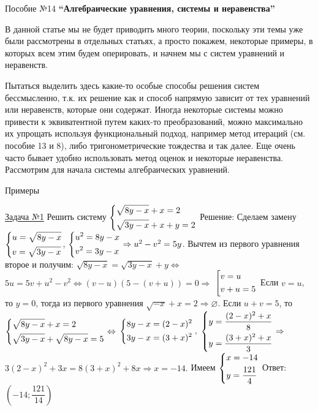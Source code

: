 \documentclass[a4paper,12pt]{article} %
\date{}
\author{}
\begin{document}
\begin{flushleft}
{Пособие №14}
\hfill
{\bf ``Алгебраические уравнения, системы и неравенства''}
\end{flushleft}				

В данной статье мы не будет приводить много теории, поскольку эти темы уже
были рассмотрены в отдельных статьях, а просто покажем, некоторые примеры, 
в которых всем этим будем оперировать, и начнем мы с систем уравнений и неравенств.

Пытаться выделить здесь какие-то особые способы решения систем бессмысленно, 
т.к. их решение как и способ напрямую зависит от тех уравнений или неравенств, которые они содержат.
Иногда некоторые системы можно привести к эквиватентной путем каких-то преобразований, можно
максимально их упрощать используя функциональный подход, например метод итераций (см. пособие 13 и 8), либо
тригонометрические тождества и так далее. Еще очень часто бывает удобно использовать метод
оценок и некоторые неравенства. Рассмотрим для начала системы алгебраических уравнений.

\begin{center}
{\large Примеры}
\end{center}

\label{Problem1}
\underline{Задача №1}
Решить систему $\begin{dcases}
	\sqrt{8y-x}+x=2 \\
	\sqrt{3y-x}+x+y=2
\end{dcases}$\newline
Решение: Сделаем замену 
$\begin{dcases}
	u = \sqrt{8y-x} \\
	v = \sqrt{3y-x}
\end{dcases}$,
$\begin{dcases}
	u^2 = 8y-x \\
	v^2 = 3y-x
\end{dcases}\Rightarrow u^2-v^2=5y$.
Вычтем из первого уравнения второе и получим: $\sqrt{8y-x}=\sqrt{3y-x}+y \Leftrightarrow$
$5u=5v+u^2-v^2 \Leftrightarrow (v-u)(5-(v+u))=0 \Rightarrow $
$\left[ \begin{gathered}
	v=u \hfill \\
	v+u = 5
\end{gathered} \right.$
Если $v=u$, то $y=0$, тогда из первого уравнения $\sqrt{-x}+x=2 \Rightarrow \varnothing$.
Если $u+v=5$, то  
$\begin{dcases}
	\sqrt{8y-x}+x=2 \\
	\sqrt{3y-x}+\sqrt{8y-x}=5
\end{dcases} \Leftrightarrow$
$\begin{dcases}
	8y-x=(2-x)^2 \\
	3y-x=(3+x)^2
\end{dcases}, $
$\begin{dcases}
	y=\dfrac{(2-x)^2+x}{8} \\
	y=\dfrac{(3+x)^2+x}{3}
\end{dcases} \Rightarrow$
$3(2-x)^2+3x=8(3+x)^2+8x \Rightarrow x=-14.$
Имеем 
$\begin{dcases}
	x = -14 \\
	y = \dfrac{121}{4}
\end{dcases}$
Ответ: $\left( -14; \dfrac{121}{14} \right)$
\end{document}
